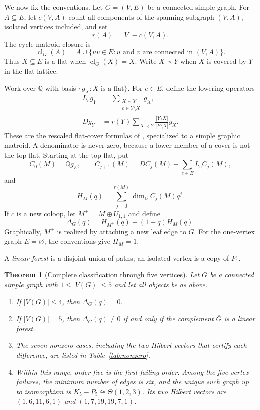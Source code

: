 \documentclass[11pt]{article}
\newtheorem{theorem}{Theorem}
\theoremstyle{remark}
\newcommand{\Q}{\mathbb{Q}}
\newcommand{\cl}{\operatorname{cl}}
\begin{document}
We now fix the conventions.  Let $G=(V,E)$ be a connected simple graph.  For
$A\subseteq E$, let $c(V,A)$ count all components of the spanning subgraph
$(V,A)$, isolated vertices included, and set
\[
  r(A)=|V|-c(V,A).
\]
The cycle-matroid closure is
\[
  \cl_G(A)=A\cup
  \{uv\in E:u\text{ and }v\text{ are connected in }(V,A)\}.
\]
Thus $X\subseteq E$ is a flat when $\cl_G(X)=X$.  Write
$X\prec Y$ when $X$ is covered by $Y$ in the flat lattice.

Work over $\Q$ with basis $\{g_X:X\text{ is a flat}\}$.  For $e\in E$,
define the lowering operators
\begin{align*}
 L_e g_Y
   &=\sum_{\substack{X\prec Y\\e\in Y\setminus X}}g_X,\\
 Dg_Y
   &=r(Y)\sum_{X\prec Y}
       \frac{|Y\setminus X|}{|E\setminus X|}g_X.
\end{align*}
These are the rescaled flat-cover formulas of
\cite[Proposition~2.4]{Sinclair2026}, specialized to a simple graphic
matroid.  A denominator is never zero, because a lower member of a cover is
not the top flat.  Starting at the top flat, put
\[
 C_0(M)=\Q g_E,
 \qquad
 C_{j+1}(M)=D C_j(M)+\sum_{e\in E}L_e C_j(M),
\]
and
\[
 H_M(q)=\sum_{j=0}^{r(M)}\dim_{\Q}C_j(M)q^j.
\]
If $c$ is a new coloop, let $M^+=M\oplus U_{1,1}$ and define
\[
  \Delta_G(q)=H_{M^+}(q)-(1+q)H_M(q).
\]
Graphically, $M^+$ is realized by attaching a new leaf edge to $G$.  For the
one-vertex graph $E=\varnothing$, the conventions give $H_M=1$.

A \emph{linear forest} is a disjoint union of paths; an isolated vertex is a
copy of $P_1$.

\begin{theorem}[Complete classification through five vertices]
\label{thm:classification}
Let $G$ be a connected simple graph with $1\leq |V(G)|\leq5$ and let all
objects be as above.
\begin{enumerate}
\item If $|V(G)|\leq4$, then $\Delta_G(q)=0$.
\item If $|V(G)|=5$, then $\Delta_G(q)\neq0$ if and only if the complement
  $\overline G$ is a linear forest.
\item The seven nonzero cases, including the two Hilbert vectors that certify
  each difference, are listed in Table~\ref{tab:nonzero}.
\item Within this range, order five is the first failing order.  Among the
  five-vertex failures, the minimum number of edges is six, and the unique
  such graph up to isomorphism is
  $K_5-P_5\cong\Theta(1,2,3)$.  Its two Hilbert vectors are
  $(1,6,11,6,1)$ and $(1,7,19,19,7,1)$.
\end{enumerate}
\end{theorem}
\end{document}
